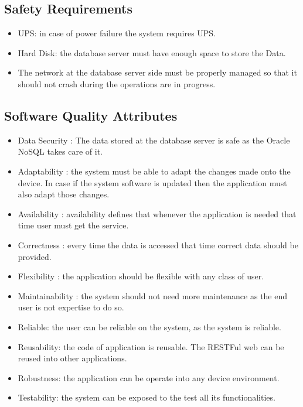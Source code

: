 \subsection{Safety Requirements}
\begin{itemize}
  \item UPS: in case of power failure the system requires UPS.
  \item Hard Disk:  the database server must have enough space to store the Data.
  \item The network at the database server side must be properly managed so that it should not crash during the operations are in progress.
\end{itemize}

\subsection{Software Quality Attributes}
\begin{itemize}
  \item Data Security : The data stored at the database server is safe as the Oracle NoSQL takes care of it.
  \item Adaptability : the system must be able to adapt the changes made onto the device. In case if the system software is updated then the application must also adapt those changes.
  \item Availability : availability defines that whenever the application is needed that time user must get the service.
  \item Correctness : every time the data is accessed that time correct data should be provided.
  \item Flexibility : the application should be flexible with any class of user.
  \item Maintainability : the system should not need more maintenance as the end user is not expertise to do so.
  \item Reliable: the user can be reliable on the system, as the system is reliable.
  \item Reusability: the code of application is reusable. The RESTFul web can be reused into other applications.
  \item Robustness: the application can be operate into any device environment.
  \item Testability: the system can be exposed to the test all its functionalities.
\end{itemize}

